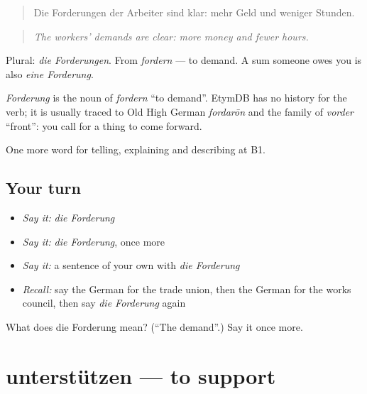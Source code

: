 \begin{quote}
Die Forderungen der Arbeiter sind klar: mehr Geld und weniger Stunden.
\end{quote}

\begin{quote}
\emph{The workers' demands are clear: more money and fewer hours.}
\end{quote}

Plural: \emph{die Forderungen}. From \emph{fordern} — to demand. A sum someone owes you is also \emph{eine Forderung}.

\begin{cousinweb}
\emph{Forderung} is the noun of \emph{fordern} \textquotedblleft{}to demand\textquotedblright{}. EtymDB has no history for the verb; it is usually traced to Old High German \emph{fordarōn} and the family of \emph{vorder} \textquotedblleft{}front\textquotedblright{}: you call for a thing to come forward.
\end{cousinweb}

\begin{grammarlens}[title={What you've built}]
One more word for telling, explaining and describing at B1.
\end{grammarlens}

\subsection*{Your turn}
\begin{itemize}
\raggedright
  \item \emph{Say it:} \emph{die Forderung}
  \item \emph{Say it:} \emph{die Forderung}, once more
  \item \emph{Say it:} a sentence of your own with \emph{die Forderung}
  \item \emph{Recall:} say the German for the trade union, then the German for the works council, then say \emph{die Forderung} again
\end{itemize}

\begin{tcolorbox}[breakable,colback=teal!4,colframe=teal!35!black,title={Before you move on}]
What does die Forderung mean? (\textquotedblleft{}The demand\textquotedblright{}.) Say it once more.
\end{tcolorbox}
\section[unterstützen]{unterstützen — to support}

